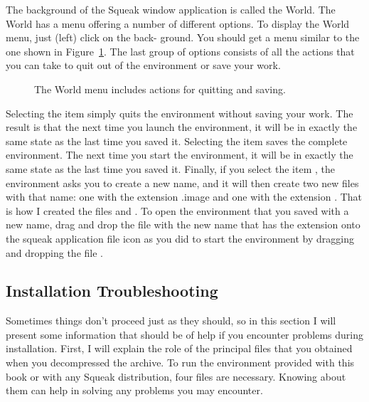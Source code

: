 \documentclass[a4paper,10pt,twoside]{book}
\begin{document}
The background of the Squeak window application is called the World. The World has a menu 
offering a number of different options. To display the World menu, just (left) click on the back- 
ground. You should get a menu similar to the one shown in Figure~\ref{fig:worldMenu}. The last group of 
options consists of all the actions that you can take to quit out of the environment or save 
your work. 


\begin{figure}[!h]
\caption{The World menu includes actions for quitting and saving.\label{fig:worldMenu}}
\end{figure}

Selecting the item  simply quits the environment without saving your work. The 
result is that the next time you launch the environment, it will be in exactly the same state as 
the last time you saved it. Selecting the item  saves the complete environment. The next 
time you start the environment, it will be in exactly the same state as the last time you saved it. 
Finally, if you select the item , the environment asks you to create a new name, and it 
will then create two new files with that name: one with the extension .image and one with the 
extension . That is how I created the files  and . To open 
the environment that you saved with a new name, drag and drop the file with the new name 
that has the extension  onto the squeak application file icon as you did to start the environment 
by dragging and dropping the file . 


\subsection{Installation Troubleshooting }
Sometimes things don’t proceed just as they should, so in this section I will present some 
information that should be of help if you encounter problems during installation. First, I will 
explain the role of the principal files that you obtained when you decompressed the archive. 
To run the environment provided with this book or with any Squeak distribution, four 
files are necessary. Knowing about them can help in solving any problems you may encounter. 
\end{document}
